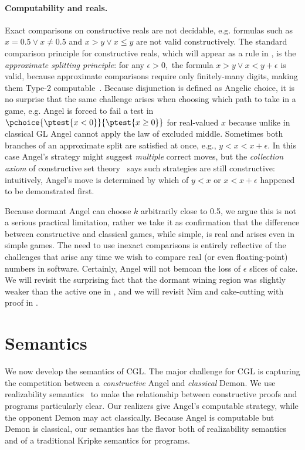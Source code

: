 \documentclass[12pt]{cmuthesis}
\theoremstyle{definition}
\theoremstyle{remark}
\newcommand{\rref}[2][]{\prettyref{#2}}
\newcommand{\CGL}{\textsf{CGL}\xspace}
\newcommand{\GL}{GL\xspace}
\begin{document}
\paragraph{Computability and reals.}
Exact comparisons on constructive reals are not decidable, e.g. formulas such as $x = 0.5 \lor x \neq 0.5$ and $x > y \lor x \leq y$ are not valid constructively.
The standard comparison principle for constructive reals, which will appear as a rule in \rref{sec:proof-calculus}, is the \emph{approximate splitting principle}:
for any $\epsilon > 0,$ the formula $x > y \lor x < y + \epsilon$ is valid, because approximate comparisons require only finitely-many digits, making them Type-2 computable~\cite{DBLP:series/txtcs/Weihrauch00}.
Because disjunction is defined as Angelic choice, it is no surprise that the same challenge arises when choosing which path to take in a game, e.g. Angel is forced to fail a test in $\pchoice{\ptest{x < 0}}{\ptest{x \geq 0}}$ for real-valued $x$ because unlike in classical \GL Angel cannot apply the law of excluded middle.
Sometimes both branches of an approximate split are satisfied at once, e.g., $y < x < x + \epsilon$.
In this case Angel's strategy might suggest \emph{multiple} correct moves, but the \emph{collection axiom} of constructive set theory~\cite{DBLP:journals/mst/Schwichtenberg08,bishop1967foundations,bridges2007techniques} says such strategies are still constructive: intuitively, Angel's move is determined by which of $y < x$ or $x < x + \epsilon$ happened to be demonstrated first.

Because dormant Angel can choose $k$ arbitrarily close to 0.5, we argue this is not a serious practical limitation, rather we take it as confirmation that the difference between constructive and classical games, while simple, is real and arises even in simple games.
The need to use inexact comparisons is entirely reflective of the challenges that arise any time we wish to compare real (or even floating-point) numbers in software.
Certainly, Angel will not bemoan the loss of $\epsilon$ slices of cake.
We will revisit the surprising fact that the dormant wining region was slightly weaker than the active one in \rref{sec:dual-sem}, and we will revisit Nim and cake-cutting with proof in \rref{sec:proof-calculus}.





\section{Semantics}
\label{sec:rel-sem}
We now develop the semantics of \CGL.
The major  challenge for \CGL is capturing the competition between a \emph{constructive} Angel and \emph{classical} Demon.
We use realizability semantics~\cite{DBLP:journals/mscs/Oosten02,lipton1992constructive} to make the relationship between constructive proofs and programs particularly clear.
Our realizers give Angel's computable strategy, while the opponent Demon may act classically.
Because Angel is computable but Demon is classical, our semantics has the flavor both of realizability semantics and of a traditional Kripke semantics for programs.
\end{document}

